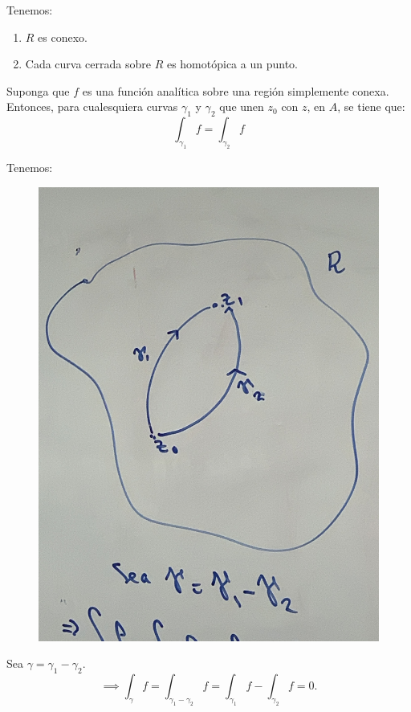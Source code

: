\begin{cajita}
    \begin{definicion}
        Tenemos:
        \begin{enumerate}
            \item $R$ es conexo.
            \item Cada curva cerrada sobre $R$ es homotópica a un punto. 
        \end{enumerate}
        
    \end{definicion}
\end{cajita}

\begin{teorema}
    Suponga que $f$ es una función analítica sobre una región simplemente conexa. Entonces, para cualesquiera curvas $\gamma_1$ y $\gamma_2$ que unen $z_0$ con $z$, en $A$, se tiene que: 
    $$\int_{\gamma_1}f=\int_{\gamma_2}f$$
    \begin{dem}
        Tenemos: 
        \begin{figure}[H]
            \centering
            \includegraphics[scale=0.1]{imagenes/12.3.jpeg}
        \end{figure}
        Sea $\gamma =\gamma_1-\gamma_2$.
        $$\implies \int_\gamma f = \int_{\gamma_1-\gamma_2}f=\int_{\gamma_1}f-\int_{\gamma_2}f=0.$$
    \end{dem}
\end{teorema}


